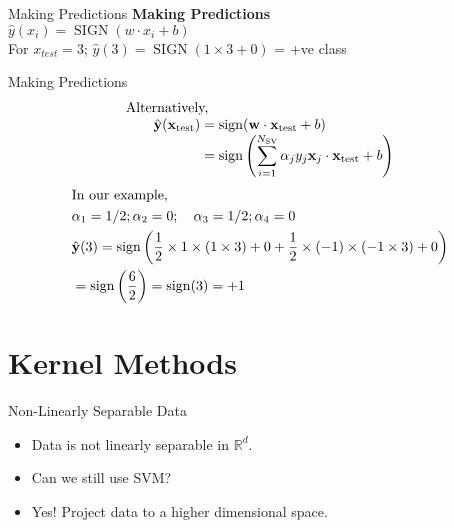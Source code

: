 \documentclass{beamer}
\begin{document}
\begin{frame}{Making Predictions}
\textbf{Making Predictions} \\
\hspace{2cm} $\hat{y}(x_i) = \operatorname{SIGN}(w \cdot x_i + b)$\\

For $x_{test} = 3$; $\hat{y}(3) = \operatorname{SIGN}(1 \times 3 + 0)$ = +ve class
\end{frame}

\begin{frame}{Making Predictions}\
\begin{align*}
\begin{array}{l}
{\text {Alternatively, }} \\
{\qquad \begin{aligned}
\hat{\mathbf{y}}(\mathbf{x}_{\text{test}}) &=\operatorname{sign}(\mathbf{w} \cdot \mathbf{x}_{\text{test}}+b) \\
&=\operatorname{sign} \left(\sum_{i=1}^{N_{\text{SV}}} \alpha_{j} y_{j} \mathbf{x}_{j} \cdot \mathbf{x}_{\text{test}}+b\right)
\end{aligned}}
\end{array}
\end{align*}
\begin{align*}
\begin{aligned}
&\text{In our example,} \\
&\alpha_{1}=1/2 ; \alpha_{2}=0 ; \quad \alpha_{3}=1/2 ; \alpha_{4}=0\\
&\hat{\mathbf{y}}(3) =\operatorname{sign}\left(\frac{1}{2} \times 1 \times (1 \times 3)+0+\frac{1}{2} \times (-1) \times (-1 \times 3)+0\right)\\
&=\operatorname{sign} \left(\frac{6}{2}\right)=\operatorname{sign}(3)=+1
\end{aligned}
\end{align*}

\end{frame}

\section{Kernel Methods}

{
	
}

\begin{frame}{Non-Linearly Separable Data}
	\begin{itemize}
		\item Data is not linearly separable in $\mathbb{R}^d$.
		\item Can we still use SVM?
		\item Yes! Project data to a higher dimensional space.
	\end{itemize}
	\end{frame}
\end{document}
